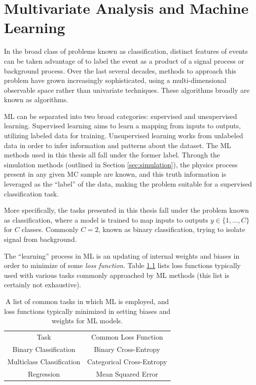 
\chapter{Multivariate Analysis and Machine Learning} \label{app:MVA}

In the broad class of problems known as classification, distinct features of events can be taken advantage of to label the event as a product of a signal process or background process. Over the last several decades, methods to approach this problem have grown increasingly sophisticated, using a multi-dimensional observable space rather than univariate techniques. These algorithms broadly are known as  algorithms.


\gls{ML} can be separated into two broad categories: supervised and unsupervised learning. Supervised learning aims to learn a mapping from inputs to outputs, utilizing labeled data for training. Unsupervised learning works from unlabeled data in order to infer information and patterns about the dataset. The \gls{ML} methods used in this thesis all fall under the former label. Through the simulation methods (outlined in Section \ref{sec:simulation}), the physics process present in any given \gls{MC} sample are known, and this truth information is leveraged as the ``label'' of the data, making the problem suitable for a supervised classification task.

More specifically, the tasks presented in this thesis fall under the problem known as classification, where a model is trained to map inputs to outputs $y \in \{1,...,C\}$ for $C$ classes. Commonly $C=2$, known as binary classification, trying to isolate signal from background.  

The ``learning'' process in \gls{ML} is an updating of internal weights and biases in order to minimize of some \textit{loss function}. Table \ref{tab:loss-functions} lists loss functions typically used with various tasks commonly approached by \gls{ML} methods (this list is certainly not exhaustive).

\begin{table}[!ht]
    \centering
    \begin{tabular}{c|c}
        Task                  & Common Loss Function \\
        \cline{1-2}
        Binary Classification     & Binary Cross-Entropy\\
        Multiclass Classification & Categorical Cross-Entropy\\
        Regression                & Mean Squared Error
    \end{tabular}  
    \caption[A list of common tasks in which \gls{ML} is employed, and loss functions typically used.]{A list of common tasks in which \gls{ML} is employed, and loss functions typically minimized in setting biases and weights for \gls{ML} models.}
    \label{tab:loss-functions}
\end{table}


